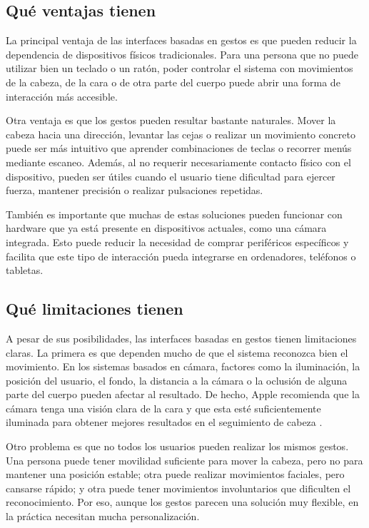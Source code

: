 \subsection{Qué ventajas tienen}

La principal ventaja de las interfaces basadas en gestos es que pueden reducir la dependencia de dispositivos físicos tradicionales. Para una persona que no puede utilizar bien un teclado o un ratón, poder controlar el sistema con movimientos de la cabeza, de la cara o de otra parte del cuerpo puede abrir una forma de interacción más accesible.

Otra ventaja es que los gestos pueden resultar bastante naturales. Mover la cabeza hacia una dirección, levantar las cejas o realizar un movimiento concreto puede ser más intuitivo que aprender combinaciones de teclas o recorrer menús mediante escaneo. Además, al no requerir necesariamente contacto físico con el dispositivo, pueden ser útiles cuando el usuario tiene dificultad para ejercer fuerza, mantener precisión o realizar pulsaciones repetidas.

También es importante que muchas de estas soluciones pueden funcionar con hardware que ya está presente en dispositivos actuales, como una cámara integrada. Esto puede reducir la necesidad de comprar periféricos específicos y facilita que este tipo de interacción pueda integrarse en ordenadores, teléfonos o tabletas.

\subsection{Qué limitaciones tienen}

A pesar de sus posibilidades, las interfaces basadas en gestos tienen limitaciones claras. La primera es que dependen mucho de que el sistema reconozca bien el movimiento. En los sistemas basados en cámara, factores como la iluminación, la posición del usuario, el fondo, la distancia a la cámara o la oclusión de alguna parte del cuerpo pueden afectar al resultado. De hecho, Apple recomienda que la cámara tenga una visión clara de la cara y que esta esté suficientemente iluminada para obtener mejores resultados en el seguimiento de cabeza \cite{appleHeadTrackingIphone}.

Otro problema es que no todos los usuarios pueden realizar los mismos gestos. Una persona puede tener movilidad suficiente para mover la cabeza, pero no para mantener una posición estable; otra puede realizar movimientos faciales, pero cansarse rápido; y otra puede tener movimientos involuntarios que dificulten el reconocimiento. Por eso, aunque los gestos parecen una solución muy flexible, en la práctica necesitan mucha personalización.

